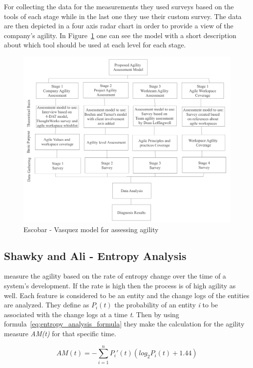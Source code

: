 For collecting the data for the measurements they used surveys based on the tools of each stage while in the last one they use their custom survey. The data are then depicted in a four axis radar chart in order to provide a view of the company's agility. In Figure~\ref{escobar_model} one can see the model with a short description about which tool should be used at each level for each stage.

\begin{figure} [H]
\centerline{\includegraphics[scale=0.75]{include/relatedwork/fig/escobar_model.pdf}}
\caption{Escobar - Vasquez model for assessing agility} 
\label{escobar_model}
\end{figure}

\subsection{Shawky and Ali - Entropy Analysis}
\citet{entropy} measure the agility based on the rate of entropy change over the time of a system's development. If the rate is high then the process is of high agility as well. Each feature is considered to be an entity and the change logs of the entities are analyzed. They define as $P_i(t)$  the probability of an entity \textit{i} to be associated with the change logs at a time \textit{t}. Then by using formula~\eqref{eq:entropy_analysis_formula} they make the calculation for the agility measure \textit{AM(t)} for that specific time.

\begin{equation} \label{eq:entropy_analysis_formula} AM(t) = - \sum_{i=1}^{n} P_i'(t) (log_2 P_i(t) + 1.44) \end{equation} 

